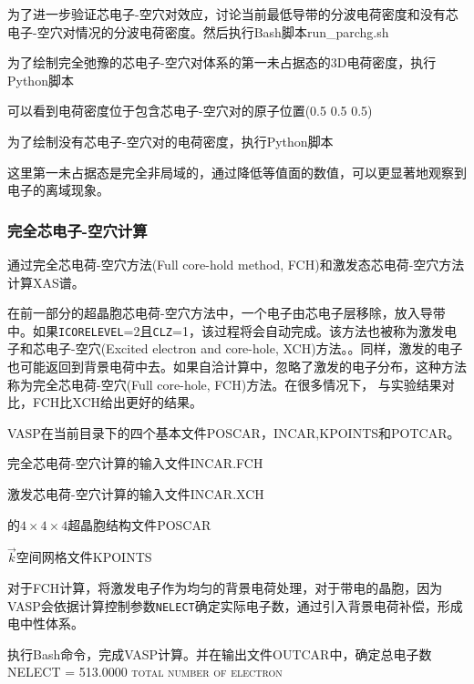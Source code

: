 为了进一步验证芯电子-空穴对效应，讨论当前最低导带的分波电荷密度和没有芯电子-空穴对情况的分波电荷密度。然后执行\textrm{Bash}脚本\textrm{run\_parchg.sh}

为了绘制完全弛豫的芯电子-空穴对体系的第一未占据态的\textrm{3D}电荷密度，执行\textrm{Python}脚本

可以看到电荷密度位于包含芯电子-空穴对的原子位置\textsc{(0.5 0.5 0.5)}

为了绘制没有芯电子-空穴对的电荷密度，执行\textrm{Python}脚本

这里第一未占据态是完全非局域的，通过降低等值面的数值，可以更显著地观察到电子的离域现象。

\subsubsection{完全芯电子-空穴计算}
通过完全芯电荷-空穴方法\textrm{(Full core-hold method, FCH)}和激发态芯电荷-空穴方法计算\textrm{XAS}谱。

在前一部分的超晶胞芯电荷-空穴方法中，一个电子由芯电子层移除，放入导带中。如果\texttt{ICORELEVEL}=2且\texttt{CLZ}=1，该过程将会自动完成。该方法也被称为激发电子和芯电子-空穴\textrm{(Excited electron and core-hole, XCH)}方法。\cite{PRL96-215502_2006}。同样，激发的电子也可能返回到背景电荷中去。如果自洽计算中，忽略了激发的电子分布，这种方法称为完全芯电荷-空穴\textrm{(Full core-hole, FCH)}方法。在很多情况下， 与实验结果对比，\textrm{FCH}比\textrm{XCH}给出更好的结果。%

\textrm{VASP}在当前目录下的四个基本文件\textrm{POSCAR}，\textrm{INCAR},\textrm{KPOINTS}和\textrm{POTCAR}。

完全芯电荷-空穴计算的输入文件\textrm{INCAR.FCH}

激发芯电荷-空穴计算的输入文件\textrm{INCAR.XCH}

的$4\times4\times4$超晶胞结构文件\textrm{POSCAR}

$\vec k$空间网格文件\textrm{KPOINTS}

对于\textrm{FCH}计算，将激发电子作为均匀的背景电荷处理，对于带电的晶胞，因为\textrm{VASP}会依据计算控制参数\texttt{NELECT}确定实际电子数，通过引入背景电荷补偿，形成电中性体系。

执行\textrm{Bash}命令，完成\textrm{VASP}计算。并在输出文件\textrm{OUTCAR}中，确定总电子数\\
\textsc{NELECT = 513.0000 total number of electron}


